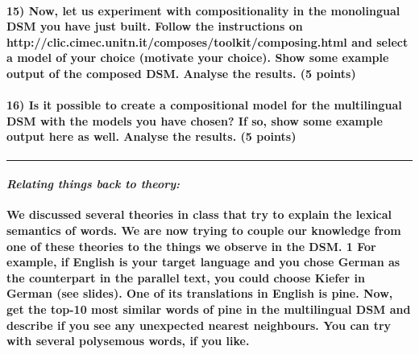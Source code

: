 \documentclass[11pt]{article}
\begin{document}
    \hypertarget{now-let-us-experiment-with-compositionality-in-the-monolingual-dsm-you-have-just-built.-follow-the-instructions-on-httpclic.cimec.unitn.itcomposestoolkitcomposing.html-and-select-a-model-of-your-choice-motivate-your-choice.-show-some-example-output-of-the-composed-dsm.-analyse-the-results.-5-points}{%
\paragraph{15) Now, let us experiment with compositionality in the
monolingual DSM you have just built. Follow the instructions on
http://clic.cimec.unitn.it/composes/toolkit/composing.html and select a
model of your choice (motivate your choice). Show some example output of
the composed DSM. Analyse the results. (5
points)}\label{now-let-us-experiment-with-compositionality-in-the-monolingual-dsm-you-have-just-built.-follow-the-instructions-on-httpclic.cimec.unitn.itcomposestoolkitcomposing.html-and-select-a-model-of-your-choice-motivate-your-choice.-show-some-example-output-of-the-composed-dsm.-analyse-the-results.-5-points}}

    \hypertarget{is-it-possible-to-create-a-compositional-model-for-the-multilingual-dsm-with-the-models-you-have-chosen-if-so-show-some-example-output-here-as-well.-analyse-the-results.-5-points}{%
\paragraph{16) Is it possible to create a compositional model for the
multilingual DSM with the models you have chosen? If so, show some
example output here as well. Analyse the results. (5
points)}\label{is-it-possible-to-create-a-compositional-model-for-the-multilingual-dsm-with-the-models-you-have-chosen-if-so-show-some-example-output-here-as-well.-analyse-the-results.-5-points}}

    \begin{center}\rule{0.5\linewidth}{\linethickness}\end{center}

\hypertarget{relating-things-back-to-theory}{%
\paragraph{\texorpdfstring{\emph{Relating things back to
theory:}}{Relating things back to theory:}}\label{relating-things-back-to-theory}}

    \textbf{We discussed several theories in class that try to explain the
lexical semantics of words. We are now trying to couple our knowledge
from one of these theories to the things we observe in the DSM. 1 For
example, if English is your target language and you chose German as the
counterpart in the parallel text, you could choose Kiefer in German (see
slides). One of its translations in English is pine. Now, get the top-10
most similar words of pine in the multilingual DSM and describe if you
see any unexpected nearest neighbours. You can try with several
polysemous words, if you like.}
\end{document}
